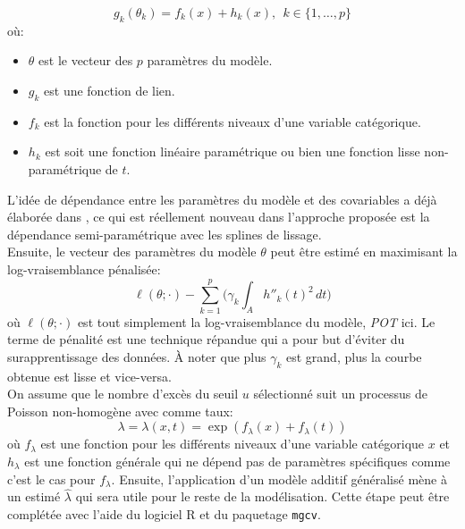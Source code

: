 \begin{equation}\label{eq:2.2.1}
g_k(\theta_k) = f_k(x) + h_k(x), \ \ k \in \{1, \dots, p \}
\end{equation}
où:
\begin{itemize}
\item $\theta$ est le vecteur des $p$ paramètres du modèle.
\item $g_k$ est une fonction de lien.
\item $f_k$ est la fonction pour les différents niveaux d'une variable catégorique.
\item $h_k$ est soit une fonction linéaire paramétrique ou bien une fonction lisse non-paramétrique de $t$.
\end{itemize}

 L'idée de dépendance entre les paramètres du modèle et des covariables a déjà élaborée dans \cite{coles2001introduction}, ce qui est réellement nouveau dans l'approche proposée est la dépendance semi-paramétrique avec les splines de lissage. \\
 
 Ensuite, le vecteur des paramètres du modèle $\theta$ peut être estimé en maximisant la log-vraisemblance pénalisée:
 \begin{equation}\label{eq:2.2.2}
 \ell(\theta; \cdot) - \sum_{k=1}^{p}\Big(\gamma_k \int_A h''_k(t)^2 \,dt\Big)
 \end{equation}
 où $ \ell(\theta; \cdot)$ est tout simplement la log-vraisemblance du modèle, \textit{POT} ici. Le terme de pénalité est une technique répandue qui a pour but d'éviter du surapprentissage des données. À noter que plus $\gamma_k$ est grand, plus la courbe obtenue est lisse et vice-versa. 
 \\
 
On assume que le nombre d'excès du seuil $u$ sélectionné suit un processus de Poisson non-homogène avec comme taux:
 \begin{equation}\label{eq:2.2.3}
 \lambda = \lambda(x, t) = \exp(f_\lambda(x) + f_\lambda(t))
  \end{equation}
  où $f_\lambda$ est une fonction pour les différents niveaux d'une variable catégorique $x$ et $h_\lambda$ est une fonction générale qui ne dépend pas de paramètres spécifiques comme c'est le cas pour $f_\lambda$. Ensuite, l'application d'un modèle additif généralisé mène à un estimé $\hat\lambda$ qui sera utile pour le reste de la modélisation. Cette étape peut être complétée avec l'aide du logiciel \textsf{R} et du paquetage \texttt{mgcv}.
  \\  
  
